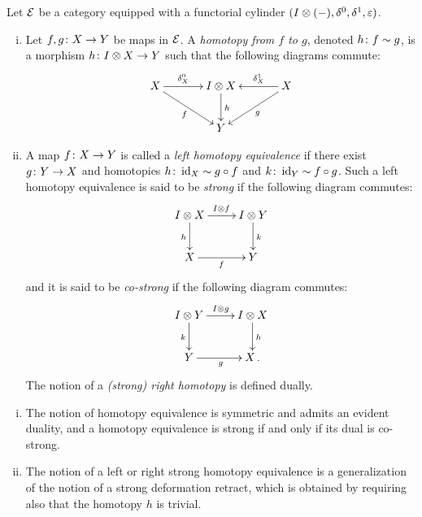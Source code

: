 \documentclass[reqno,10pt,a4paper,oneside]{amsart}
\begin{document}
\begin{definition} \label{def:homotopy} Let $\mathcal{E}$ be a category equipped with a functorial cylinder $(I \otimes (-), \delta^0, \delta^1, \varepsilon)$.
\begin{enumerate}[(i)] 
\item  Let $f, g \colon X \to Y$ be maps in $\mathcal{E}$. A \emph{homotopy from $f$ to $g$}, denoted $h \colon f \sim g$,  is a morphism 
$h \colon I \otimes X \to Y$ such that the following diagrams commute:
\[
\xymatrix@C=1.2cm{
X \ar[r]^-{\lcyl_X} \ar[dr]_{f} & \interval \otimes X \ar[d]^{h} & X \ar[dl]^{g} \ar[l]_-{\rcyl_X}  \\
 & Y & }
 \]
 \item A map $f \colon X \to Y$ is called a \emph{left homotopy equivalence} if there exist $g \colon Y \to X$ and homotopies $h \colon \operatorname{id}_X \sim g \mathbin{\circ} f$ and $k \colon
\operatorname{id}_Y \sim f \mathbin{\circ} g$. Such a left homotopy equivalence is said to be \emph{strong} if the
following diagram commutes:
\[
\xymatrix{
\interval \otimes X \ar[r]^{\interval \otimes f } \ar[d]_{h} & \interval \otimes Y \ar[d]^{k} \\
X \ar[r]_{f} & Y}
\]
and it is said to be \emph{co-strong} if  the following diagram commutes:
\[
\xymatrix{
\interval \otimes Y \ar[r]^{\interval \otimes g } \ar[d]_{k} & \interval \otimes X \ar[d]^{h} \\
Y \ar[r]_{g} & X \, .}
\]
The notion of a \emph{(strong) right homotopy} is defined dually.
\end{enumerate}
\end{definition}



\begin{remark} \hfill 
\begin{enumerate}[(i)]
\item  The notion of homotopy equivalence is symmetric and admits an evident duality, and a homotopy equivalence is strong if 
and only if its dual is co-strong. 
\item The notion of a left or right strong homotopy equivalence is a generalization of the notion of a strong deformation retract, which is obtained by requiring also
that the homotopy $h$ is trivial.
\end{enumerate}
\end{remark}
\end{document}
